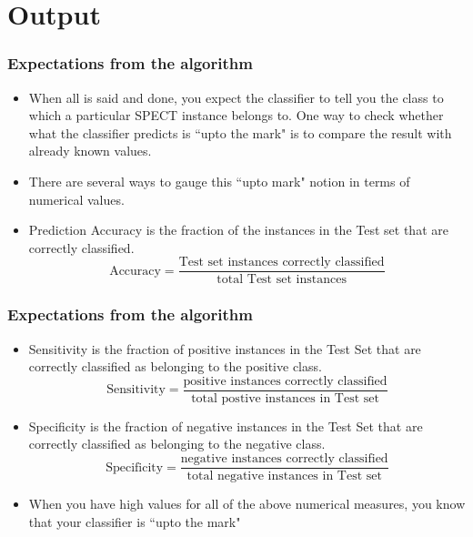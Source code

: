 \documentclass[11pt,xcolor=dvipsnames]{beamer}
\begin{document}
\section{Output}	
\begin{frame}
\frametitle{Expectations from the algorithm}
\begin{itemize}
\item When all is said and done, you expect the classifier to tell you the class to which a particular SPECT instance belongs to. One way to check whether what the classifier predicts is ``upto the mark" is to compare the result with already known values.\\
\item There are several ways to gauge this ``upto mark" notion in terms of numerical values.\\
\item {\color{PineGreen}Prediction Accuracy} is the fraction of the instances in the Test set that are correctly classified.\\
\begin{displaymath}\text{Accuracy} = \frac{\text{Test set instances correctly classified}}{\text{total Test set instances}}\end{displaymath}    
\end{itemize}
\end{frame}



\begin{frame}
\frametitle{Expectations from the algorithm}
\begin{itemize}
\item {\color{PineGreen}Sensitivity} is the fraction of positive instances in the Test Set that are correctly classified as belonging to the positive class.
\begin{displaymath}\text{Sensitivity} = \frac{\text{positive instances correctly classified}}{\text{total postive instances in Test set}}\end{displaymath}        
\item {\color{PineGreen}Specificity} is the fraction of negative instances in the Test Set that are correctly classified as belonging to the negative class.
\begin{displaymath}\text{Specificity} = \frac{\text{negative instances correctly classified}}{\text{total negative instances in Test set}}\end{displaymath}
\item When you have high values for all of the above numerical measures, you know that your classifier is ``upto the mark"
\end{itemize}
\end{frame}
\end{document}
